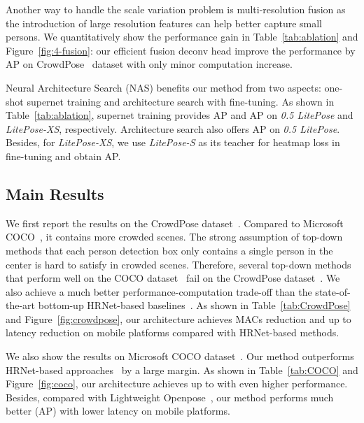 \documentclass[10pt,twocolumn,letterpaper]{article}
\begin{document}
 Another way to handle the scale variation problem is multi-resolution fusion as the introduction of large resolution features can help better capture small persons. We quantitatively show the performance gain in Table~\ref{tab:ablation} and Figure~\ref{fig:4-fusion}: our efficient fusion deconv head improve the performance by AP on CrowdPose~\cite{li2019crowdpose} dataset with only minor computation increase.

 Neural Architecture Search (NAS) benefits our method from two aspects: one-shot supernet training and architecture search with fine-tuning. As shown in Table~\ref{tab:ablation}, supernet training provides AP and AP on \textit{0.5 LitePose} and \textit{LitePose-XS}, respectively. Architecture search also offers AP on \textit{0.5 LitePose}. Besides, for \textit{LitePose-XS}, we use \textit{LitePose-S} as its teacher for heatmap loss in fine-tuning and obtain AP. 

\subsection{Main Results}

 We first report the results on the CrowdPose dataset~\cite{li2019crowdpose}. Compared to Microsoft COCO~\cite{lin2014microsoft}, it contains more crowded scenes. The strong assumption of top-down methods that each person detection box only contains a single person in the center is hard to satisfy in crowded scenes. Therefore, several top-down methods~\cite{he2017mask,fang2017rmpe} that perform well on the COCO dataset~\cite{lin2014microsoft} fail on the CrowdPose dataset~\cite{li2019crowdpose}. We also achieve a much better performance-computation trade-off than the state-of-the-art bottom-up HRNet-based baselines~\cite{cheng2020higherhrnet,neff2020efficienthrnet}. As shown in Table~\ref{tab:CrowdPose} and Figure~\ref{fig:crowdpose}, our architecture achieves  MACs reduction and up to  latency reduction on mobile platforms compared with HRNet-based methods.



 We also show the results on Microsoft COCO dataset~\cite{lin2014microsoft}. Our method outperforms HRNet-based approaches~\cite{cheng2020higherhrnet,neff2020efficienthrnet} by a large margin. As shown in Table~\ref{tab:COCO} and Figure~\ref{fig:coco}, our architecture achieves up to  with even higher performance. Besides, compared with Lightweight Openpose~\cite{osokin2018real}, our method performs much better (AP) with lower latency on mobile platforms. 
\end{document}
